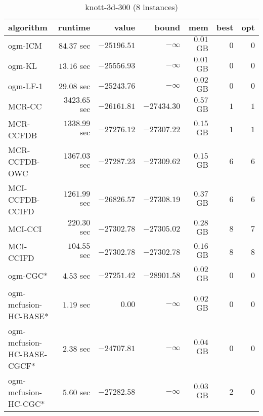 \begin{table}[H]
\tiny
\centering
\caption{knott-3d-300 (8 instances)}
\label{tab:smalltable-knott-3d-300}
\begin{tabular}{lrrrrrr}
\toprule
           algorithm &       runtime     &         value &         bound &           mem &     best &      opt   \\ \midrule 
             ogm-ICM & $        84.37$ sec & $    -25196.51$ & $-\infty$ & $         0.01$ GB & $       0$ & $       0$ \\ 
              ogm-KL & $        13.16$ sec & $    -25556.93$ & $-\infty$ & $         0.01$ GB & $       0$ & $       0$ \\ 
            ogm-LF-1 & $        29.08$ sec & $    -25243.76$ & $-\infty$ & $         0.02$ GB & $       0$ & $       0$ \\ 
\cmidrule{1-1} 
              MCR-CC & $      3423.65$ sec & $    -26161.81$ & $    -27434.30$ & $         0.57$ GB & $       1$ & $       1$ \\ 
           MCR-CCFDB & $      1338.99$ sec & $    -27276.12$ & $    -27307.22$ & $         0.15$ GB & $       1$ & $       1$ \\ 
       MCR-CCFDB-OWC & $      1367.03$ sec & $    -27287.23$ & $    -27309.62$ & $         0.15$ GB & $       6$ & $       6$ \\ 
\cmidrule{1-1} 
     MCI-CCFDB-CCIFD & $      1261.99$ sec & $    -26826.57$ & $    -27308.19$ & $         0.37$ GB & $       6$ & $       6$ \\ 
             MCI-CCI & $       220.30$ sec & $    -27302.78$ & $    -27305.02$ & $         0.28$ GB & $       8$ & $       7$ \\ 
           MCI-CCIFD & $       104.55$ sec & $    -27302.78$ & $    -27302.78$ & $         0.16$ GB & $       8$ & $       8$ \\ 
\cmidrule{1-1} 
            ogm-CGC* & $         4.53$ sec & $    -27251.42$ & $    -28901.58$ & $         0.02$ GB & $       0$ & $       0$ \\ 
ogm-mcfusion-HC-BASE* & $         1.19$ sec & $         0.00$ & $-\infty$ & $         0.02$ GB & $       0$ & $       0$ \\ 
ogm-mcfusion-HC-BASE-CGCF* & $         2.38$ sec & $    -24707.81$ & $-\infty$ & $         0.04$ GB & $       0$ & $       0$ \\ 
ogm-mcfusion-HC-CGC* & $         5.60$ sec & $    -27282.58$ & $-\infty$ & $         0.03$ GB & $       2$ & $       0$ \\ 

\end{tabular}
\end{table}
